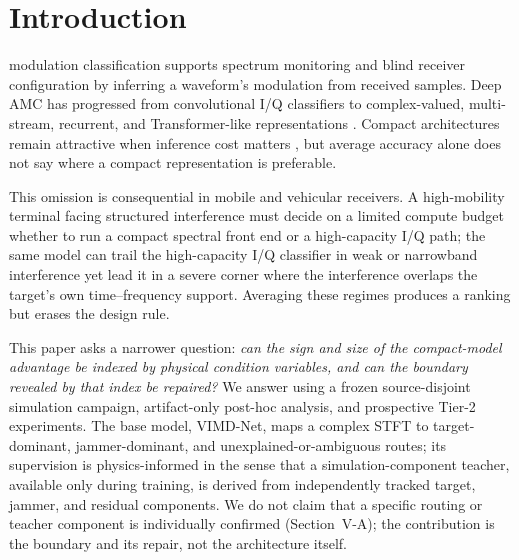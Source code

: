 \documentclass[letterpaper,journal]{IEEEtran}
\newcommand{\method}{VIMD-Net}
\begin{document}
\begin{center}
\end{center}

\section{Introduction}
 modulation classification supports spectrum
monitoring and blind receiver configuration by inferring a waveform's
modulation from received samples. Deep AMC has progressed from convolutional
I/Q classifiers \cite{oshea2016cnn,meng2018amc} to complex-valued,
multi-stream, recurrent, and Transformer-like representations
\cite{tu2020complex,zhang2020dual,xu2020mcldnn,cai2022transformer,
shao2025iqformer}. Compact architectures remain attractive when inference cost
matters \cite{wang2020lightamc,efficientamc2026tgcn}, but average accuracy
alone does not say where a compact representation is preferable.

This omission is consequential in mobile and vehicular receivers. A
high-mobility terminal facing structured interference must decide on a limited
compute budget whether to run a compact spectral front end or a high-capacity
I/Q path; the same model can trail the high-capacity I/Q classifier in weak or
narrowband interference yet lead it in a severe corner where the interference
overlaps the target's own time--frequency support. Averaging these regimes
produces a ranking but erases the design rule.

This paper asks a narrower question: \emph{can the sign and size of the
compact-model advantage be indexed by physical condition variables, and can the
boundary revealed by that index be repaired?} We answer using a frozen
source-disjoint simulation campaign, artifact-only post-hoc analysis, and
prospective Tier-2 experiments. The base model, \method, maps a complex STFT to
target-dominant, jammer-dominant, and unexplained-or-ambiguous routes; its
supervision is physics-informed in the sense that a simulation-component
teacher, available only during training, is derived from independently tracked
target, jammer, and residual components. We do not claim that a specific
routing or teacher component is individually confirmed (Section~V-A); the
contribution is the boundary and its repair, not the architecture itself.
\end{document}
